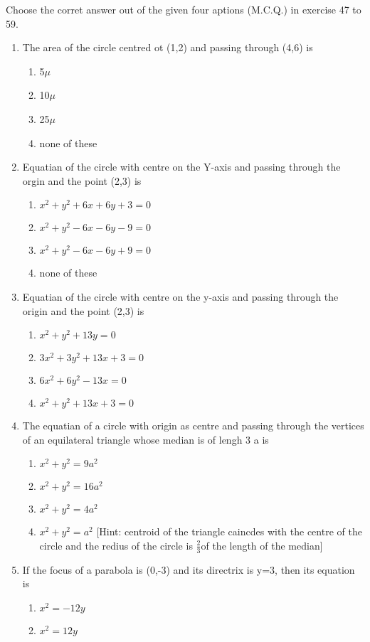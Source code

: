 \documentclass[12pt]{article}
\begin{document}
Choose the corret answer out of the given four aptions (M.C.Q.) in exercise 47 to 59.
\begin{enumerate}[resume]
\item The area of the circle centred ot (1,2) and passing through (4,6) is
\begin{enumerate}
\item 5$\mu$ 
\item 10$\mu$
 \item 25$\mu$ 
\item none of these
\end{enumerate}
\item Equatian of the circle with centre on the Y-axis and passing through the orgin and the point (2,3) is
\begin{enumerate}
\item $x^2+y^2+6x+6y+3=0$ 
\item $x^2+y^2-6x-6y-9=0$
\item $x^2+y^2-6x-6y+9=0$
\item none of these
\end{enumerate}
\item Equatian of the circle with centre on the  y-axis and passing through the origin and the point (2,3) is  
\begin{enumerate}
\item $x^2+y^2+13y=0$
\item $3x^2+3y^2+13x+3=0$
\item $6x^2+6y^2-13x=0$
\item $x^2+y^2+13x+3=0$
\end{enumerate}
\item The equatian of a circle with origin as centre and passing through the vertices of an equilateral triangle whose median is of lengh 3 a is
\begin{enumerate}
\item $x^2+y^2=9a^2$
\item $x^2+y^2=16a^2$
\item $x^2+y^2=4a^2$
\item $x^2+y^2=a^2$
	[Hint: centroid of the triangle caincdes with the centre of the circle and the redius of the circle is $\frac{2}{3}$of the length of the median]
\end{enumerate}
\item If the focus of a parabola is (0,-3) and its directrix is y=3, then its equation is
\begin{enumerate}
\item $x^2=-12y$
\item $x^2=12y$

\end{enumerate}
\end{enumerate}
\end{document}

